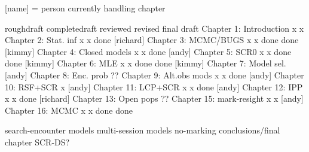[name] = person currently handling chapter


                          roughdraft   completedraft  reviewed  revised            final draft
Chapter 1: Introduction       x              x
Chapter 2: Stat. inf          x              x         done     [richard]
Chapter 3: MCMC/BUGS          x              x         done      done    [kimmy]
Chapter 4: Closed models      x              x         done     [andy]
Chapter 5: SCR0               x              x         done      done    [kimmy]
Chapter 6: MLE                x              x         done      done    [kimmy]
Chapter 7: Model sel.       [andy]
Chapter 8: Enc. prob        ??
Chapter 9: Alt.obs mods       x              x         done     [andy] 
Chapter 10: RSF+SCR           x           [andy]
Chapter 11: LCP+SCR           x              x         done     [andy]
Chapter 12: IPP               x              x         done     [richard]
Chapter 13: Open pops       ??
Chapter 15: mark-resight      x              x        [andy]
Chapter 16: MCMC              x              x         done      done


search-encounter models
multi-session models
no-marking 
conclusions/final chapter
SCR-DS?


